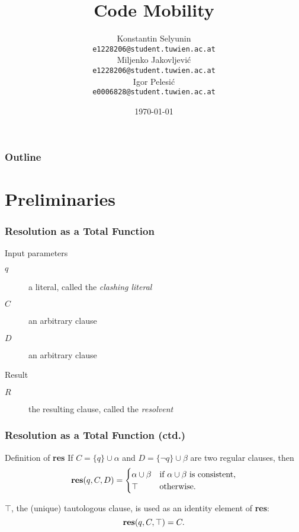 \documentclass{beamer}
\title[Code Mobility]{Code Mobility}
\date{\today}
\author[Jakovljevi\'c,Selyunin,Pelesi\'c]{
 \Large{Konstantin Selyunin}\\
  \small{\texttt{e1228206@student.tuwien.ac.at}}\\
 \Large{Miljenko Jakovljevi\'c}\\
  \small{\texttt{e1228206@student.tuwien.ac.at}}\\
  \Large{Igor Pelesi\'c}\\
  \small{\texttt{e0006828@student.tuwien.ac.at}}\\
}
\theoremstyle{definition} \newtheorem{mdefinition}{Definition}
\theoremstyle{plain} \newtheorem{mtheorem}{Theorem}
\theoremstyle{plain} \newtheorem{mcorollary}{Corollary}
\theoremstyle{plain} \newtheorem{mfact}{Fact}
\begin{document}

\begin{frame}
	\titlepage
\end{frame}

\begin{frame}
	\frametitle{Outline}
	\tableofcontents
\end{frame}

\section{Preliminaries}

\begin{frame}
	\frametitle{Resolution as a Total Function}
	\begin{block}{Input parameters}
		\begin{description}
			\item[$q$]	a literal, called the {\it clashing literal}
			\item[$C$]	an arbitrary clause
			\item[$D$]	an arbitrary clause
		\end{description}
	\end{block}
	
	\begin{block}{Result}
		\begin{description}
			\item[$R$]	the resulting clause, called the {\it resolvent}
		\end{description}
	\end{block}
\end{frame}

\begin{frame}
	\frametitle{Resolution as a Total Function (ctd.)}
	\begin{block}{Definition of {\bf res}}
		If $C = \{q\} \cup \alpha$ and $D = \{\neg q\} \cup \beta$ are two regular clauses, then
		\begin{equation*}
			{\bf res}(q,C,D) =	\begin{cases}
														\alpha \cup \beta	& \text{if } \alpha \cup \beta \text{ is consistent,}\\
														\top							& \text{otherwise.}
													\end{cases}
		\end{equation*}
		
		$\top$, the (unique) tautologous clause, is used as an identity element of {\bf res}:
		\begin{equation*}
			{\bf res}(q,C,\top) =	C.
		\end{equation*}
	\end{block}
\end{frame}
\end{document}
